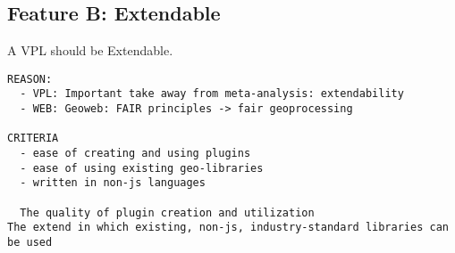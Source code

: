 







\subsection*{Feature B: Extendable}

A VPL should be Extendable. 

\begin{lstlisting}
REASON: 
  - VPL: Important take away from meta-analysis: extendability
  - WEB: Geoweb: FAIR principles -> fair geoprocessing

CRITERIA
  - ease of creating and using plugins 
  - ease of using existing geo-libraries 
  - written in non-js languages

  The quality of plugin creation and utilization
The extend in which existing, non-js, industry-standard libraries can be used

\end{lstlisting}



